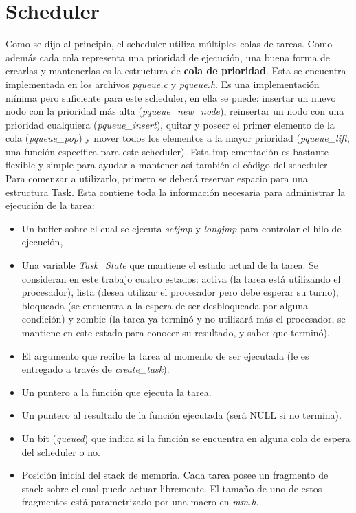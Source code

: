 \documentclass[a4paper]{article}
\begin{document}
\section{Scheduler}
Como se dijo al principio, el scheduler utiliza múltiples colas de tareas.
Como además cada cola representa una prioridad de ejecución, una buena forma
de crearlas y mantenerlas es la estructura de \textbf{cola de prioridad}.
Esta se encuentra implementada en los archivos \textit{pqueue.c} y
\textit{pqueue.h}. Es una implementación mínima pero suficiente para este
scheduler, en ella se puede: insertar un nuevo nodo con la prioridad más
alta (\textit{pqueue\_new\_node}), reinsertar un nodo con una prioridad
cualquiera (\textit{pqueue\_insert}), quitar y poseer el primer elemento
de la cola (\textit{pqueue\_pop}) y mover todos los elementos a la mayor
prioridad (\textit{pqueue\_lift}, una función específica para este scheduler).
Esta implementación es bastante flexible y simple para ayudar a mantener
así también el código del scheduler. \\
Para comenzar a utilizarlo, primero se deberá reservar espacio para una
estructura Task. Esta contiene toda la información necesaria para
administrar la ejecución de la tarea: 
\begin{itemize}
    \item Un buffer sobre el cual se ejecuta \textit{setjmp} y
    \textit{longjmp} para controlar el hilo de ejecución,
    \item Una variable \textit{Task\_State} que mantiene el estado actual
    de la tarea. Se consideran en este trabajo cuatro estados: activa
    (la tarea está utilizando el procesador), lista (desea utilizar el
    procesador pero debe esperar su turno), bloqueada (se encuentra a
    la espera de ser desbloqueada por alguna condición) y zombie (la
    tarea ya terminó y no utilizará más el procesador, se mantiene en
    este estado para conocer su resultado, y saber que terminó).
    \item El argumento que recibe la tarea al momento de ser ejecutada
    (le es entregado a través de \textit{create\_task}).
    \item Un puntero a la función que ejecuta la tarea.
    \item Un puntero al resultado de la función ejecutada (será NULL
    si no termina).
    \item Un bit (\textit{queued}) que indica si la función se encuentra
    en alguna cola de espera del scheduler o no.
    \item Posición inicial del stack de memoria. Cada tarea posee un
    fragmento de stack sobre el cual puede actuar libremente. El tamaño
    de uno de estos fragmentos está parametrizado por una macro en
    \textit{mm.h}.
\end{itemize}
\end{document}
